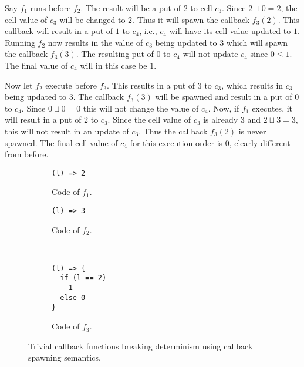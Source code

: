Say $f_1$ runs before $f_2$. The result will be a put of $2$ to cell $c_3$.
Since $2 \sqcup 0 = 2$, the cell value of $c_3$ will be changed to $2$. Thus it
will spawn the callback $f_3(2)$. This callback will result in a put of $1$ to
$c_4$, i.e., $c_4$ will have its cell value updated to $1$. Running $f_2$ now
results in the value of $c_3$ being updated to $3$ which will spawn the callback
$f_3(3)$. The resulting put of $0$ to $c_4$ will not update $c_4$ since $0 \leq
1$. The final value of $c_4$ will in this case be $1$.

Now let $f_2$ execute before $f_3$. This results in a put of $3$ to $c_3$, which
results in $c_3$ being updated to $3$. The callback $f_3(3)$ will be spawned and
result in a put of $0$ to $c_4$. Since $0 \sqcup 0 = 0$ this will not change the
value of $c_4$. Now, if $f_1$ executes, it will result in a put of $2$ to $c_3$.
Since the cell value of $c_3$ is already $3$ and $2 \sqcup 3 = 3$, this will not
result in an update of $c_3$. Thus the callback $f_3(2)$ is never spawned. The
final cell value of $c_4$ for this execution order is $0$, clearly different
from before.
\begin{figure}
  \begin{minipage}{0.5\textwidth}
    \begin{subfigure}[b]{\linewidth}
      \begin{lstlisting}
(l) => 2
      \end{lstlisting}
      \caption{Code of $f_1$.}
    \end{subfigure}
    
    \begin{subfigure}[b]{\linewidth}
      \begin{lstlisting}
(l) => 3
      \end{lstlisting}
      \caption{Code of $f_2$.}
    \end{subfigure}
  \end{minipage}
  ~
  \begin{minipage}{0.5\textwidth}
    \begin{subfigure}[b]{\linewidth}
      \begin{lstlisting}
(l) => {
  if (l == 2)
    1
  else 0
}
      \end{lstlisting}
      \caption{Code of $f_3$.}
    \end{subfigure}
  \end{minipage}
  \caption{Trivial callback functions breaking determinism using callback spawning semantics.}
  \label{fig:ra_fun_callback_spawn}
\end{figure}

